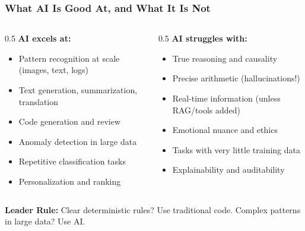\begin{frame}[fragile]\frametitle{What AI Is Good At, and What It Is Not}

\begin{columns}
  \begin{column}[T]{0.5\linewidth}
  \textbf{AI excels at:}
  \begin{itemize}
  \item Pattern recognition at scale (images, text, logs)
  \item Text generation, summarization, translation
  \item Code generation and review
  \item Anomaly detection in large data
  \item Repetitive classification tasks
  \item Personalization and ranking
  \end{itemize}
  \end{column}
  \begin{column}[T]{0.5\linewidth}
  \textbf{AI struggles with:}
  \begin{itemize}
  \item True reasoning and causality
  \item Precise arithmetic (hallucinations!)
  \item Real-time information (unless RAG/tools added)
  \item Emotional nuance and ethics
  \item Tasks with very little training data
  \item Explainability and auditability
  \end{itemize}
  \end{column}
\end{columns}

\vspace{0.5em}
\textbf{Leader Rule:} Clear deterministic rules? Use traditional code. Complex patterns in large data? Use AI.
\end{frame}

